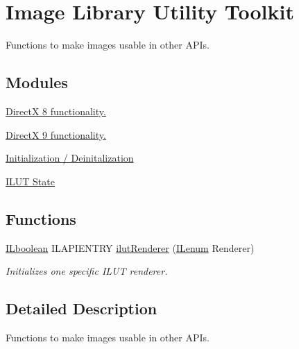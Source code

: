 \hypertarget{group___i_l_u_t}{\section{Image Library Utility Toolkit}
\label{group___i_l_u_t}
}


Functions to make images usable in other A\+P\+Is.  


\subsection*{Modules}
\begin{DoxyCompactItemize}
\item 
\hyperlink{group__ilut__dx8}{Direct\+X 8 functionality.}
\item 
\hyperlink{group__ilut__dx9}{Direct\+X 9 functionality.}
\item 
\hyperlink{group__ilu__setup}{Initialization / Deinitalization}
\item 
\hyperlink{group__ilut__state}{I\+L\+U\+T State}
\end{DoxyCompactItemize}
\subsection*{Functions}
\begin{DoxyCompactItemize}
\item 
\hyperlink{group__il__types_gaa6aa7c95cfdc06b4d8601ef832b7bb0a}{I\+Lboolean} I\+L\+A\+P\+I\+E\+N\+T\+R\+Y \hyperlink{group___i_l_u_t_ga7d62c8cba1fdb8a88451ff415f298865}{ilut\+Renderer} (\hyperlink{group__il__types_ga62ca73445716183ef42b1f3906a45ed0}{I\+Lenum} Renderer)
\begin{DoxyCompactList}\small\item\em Initializes one specific I\+L\+U\+T renderer. \end{DoxyCompactList}\end{DoxyCompactItemize}


\subsection{Detailed Description}
Functions to make images usable in other A\+P\+Is. 



